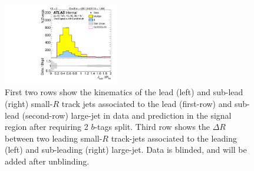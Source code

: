 \begin{figure}[htbp!]
\begin{center}
\includegraphics[width=0.45\textwidth,angle=-90]{figures/boosted/Signal/b77_TwoTag_split_Signal_sublHCand_trk_dr_blind.pdf}
  \caption{First two rows show the kinematics of the lead (left) and sub-lead (right) small-$R$ track jets associated to the lead (first-row) and sub-lead (second-row) large-\R jet in data and prediction in the signal region after requiring 2 $b$-tags split. Third row shows the $\Delta R$ between two leading small-$R$ track-jets associated to the leading (left) and sub-leading (right) large-\R jet. Data is blinded, and will be added after unblinding. }
  \label{fig:boosted-2bs-signal-blind-ak2}
\end{center}
\end{figure}



